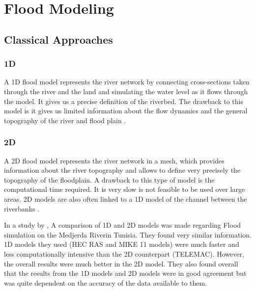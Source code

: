 
\chapter{Flood Modeling} %
\label{Chapter3} %
\section{Classical Approaches}

\subsection{1D}
	A 1D flood model represents the river network by connecting cross-sections taken through the river and the land and simulating the water level as it flows through the model. It gives us a precise definition of the riverbed. The drawback to this model is it gives us limited information about the flow dynamics and the general topography of the river and flood plain \cite{Flood}.
\subsection{2D}
	 A 2D flood model represents the river network in a mesh, which provides information about the river topography and allows to define very precisely the topography of the floodplain. A drawback to this type of model is the computational time required. It is very slow is not feasible to be used over large areas. 2D models are also often linked to a 1D model of the channel between the riverbanks \cite{Flood}.
	 
	In a study by \cite{Gharbi}, A comparison of 1D and 2D models was made regarding Flood simulation on the Medjerda Riverin Tunisia. They found very similar information. 1D models they used (HEC RAS and MIKE 11 models) were much faster and less computationally intensive than the 2D counterpart (TELEMAC). However, the overall results were much better in the 2D model. They also found overall that the results from the 1D models and 2D models were in good agreement but was quite dependent on the accuracy of the data available to them.
	
